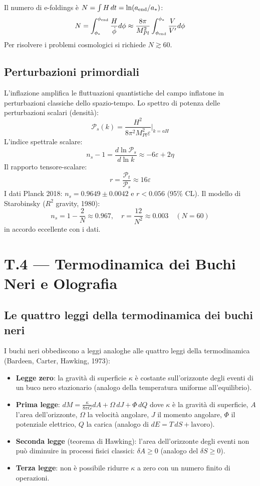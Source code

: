 \documentclass[11.5pt,a4paper,openany]{book}
\theoremstyle{remark}
\begin{document}
Il numero di e-foldings è $N = \int H\,dt = \ln(a_{\rm end}/a_*)$:
\[
N = \int_{\phi_*}^{\phi_{\rm end}} \frac{H}{\dot\phi}d\phi \approx \frac{8\pi}{M_{Pl}^2}\int_{\phi_{\rm end}}^{\phi_*}\frac{V}{V'}d\phi
\]
Per risolvere i problemi cosmologici si richiede $N \gtrsim 60$.

\section{Perturbazioni primordiali}

L'inflazione amplifica le fluttuazioni quantistiche del campo inflatone in perturbazioni classiche dello spazio-tempo. Lo spettro di potenza delle perturbazioni scalari (densità):
\[
\mathcal{P}_s(k) = \frac{H^2}{8\pi^2 M_{Pl}^2 \varepsilon}\bigg|_{k=aH}
\]
L'indice spettrale scalare:
\[
n_s - 1 = \frac{d\ln\mathcal{P}_s}{d\ln k} \approx -6\varepsilon + 2\eta
\]
Il rapporto tensore-scalare:
\[
r = \frac{\mathcal{P}_t}{\mathcal{P}_s} \approx 16\varepsilon
\]
I dati Planck 2018: $n_s = 0.9649 \pm 0.0042$ e $r < 0.056$ (95\% CL). Il modello di Starobinsky ($R^2$ gravity, 1980):
\[
n_s = 1 - \frac{2}{N} \approx 0.967, \quad r = \frac{12}{N^2} \approx 0.003 \quad (N = 60)
\]
in accordo eccellente con i dati.

\chapter*{T.4 — Termodinamica dei Buchi Neri e Olografia}

\section{Le quattro leggi della termodinamica dei buchi neri}

I buchi neri obbediscono a leggi analoghe alle quattro leggi della termodinamica (Bardeen, Carter, Hawking, 1973):

\begin{itemize}
\item \textbf{Legge zero}: la gravità di superficie $\kappa$ è costante sull'orizzonte degli eventi di un buco nero stazionario (analogo della temperatura uniforme all'equilibrio).
\item \textbf{Prima legge}: $dM = \frac{\kappa}{8\pi G}dA + \Omega\, dJ + \Phi\, dQ$ dove $\kappa$ è la gravità di superficie, $A$ l'area dell'orizzonte, $\Omega$ la velocità angolare, $J$ il momento angolare, $\Phi$ il potenziale elettrico, $Q$ la carica (analogo di $dE = T\,dS + \text{lavoro}$).
\item \textbf{Seconda legge} (teorema di Hawking): l'area dell'orizzonte degli eventi non può diminuire in processi fisici classici: $\delta A \geq 0$ (analogo del $\delta S \geq 0$).
\item \textbf{Terza legge}: non è possibile ridurre $\kappa$ a zero con un numero finito di operazioni.
\end{itemize}
\end{document}
